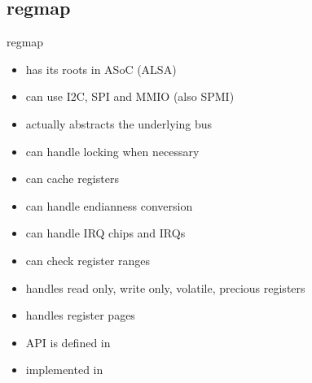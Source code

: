 \subsection{regmap}

\begin{frame}[fragile]{regmap}
  \begin{itemize}
    \item has its roots in ASoC (ALSA)
    \item can use I2C, SPI and MMIO (also SPMI)
    \item actually abstracts the underlying bus
    \item can handle locking when necessary
    \item can cache registers
    \item can handle endianness conversion
    \item can handle IRQ chips and IRQs
    \item can check register ranges
    \item handles read only, write only, volatile, precious registers
    \item handles register pages
    \item API is defined in 
    \item implemented in 
  \end{itemize}
\end{frame}

